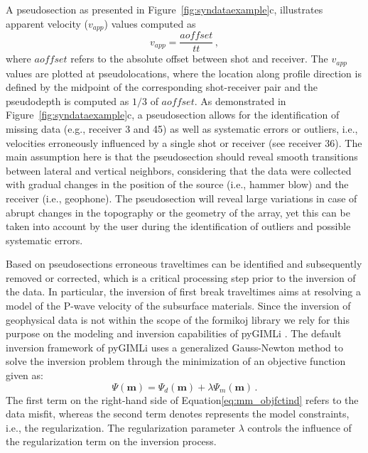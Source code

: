 \documentclass[a4paper,fleqn]{cas-sc}
\newcommand{\vecmat}[1]{\bm #1}
\begin{document}
A pseudosection as presented in Figure~\ref{fig:syndataexample}c, illustrates apparent velocity ($v_{app}$) values computed as
\begin{equation}
	v_{app}=\frac{aoffset}{tt}\,,
	\label{eq:vapp}
\end{equation}
where $aoffset$ refers to the absolute offset between shot and receiver. The $v_{app}$ values are plotted at pseudolocations, where the location along profile direction is defined by the midpoint of the corresponding shot-receiver pair and the pseudodepth is computed as $1/3$ of $aoffset$.
As demonstrated in Figure~\ref{fig:syndataexample}c, a pseudosection allows for the identification of missing data (e.g., receiver 3 and 45) as well as systematic errors or outliers, i.e., velocities erroneously influenced by a single shot or receiver (see receiver 36). The main assumption here is that the pseudosection should reveal smooth transitions between lateral and vertical neighbors, considering that the data were collected with gradual changes in the position of the source (i.e., hammer blow) and the receiver (i.e., geophone). The pseudosection will reveal large variations in case of abrupt changes in the topography or the geometry of the array, yet this can be taken into account by the user during the identification of outliers and possible systematic errors.

Based on pseudosections erroneous traveltimes can be identified and subsequently removed or corrected, which is a critical processing step prior to the inversion of the data. In particular, the inversion of first break traveltimes aims at resolving a model of the P-wave velocity of the subsurface materials. Since the inversion of geophysical data is not within the scope of the formikoj library we rely for this purpose on the modeling and inversion capabilities of pyGIMLi \citep{ruecker2017}. The default inversion framework of pyGIMLi uses a generalized Gauss-Newton method to solve the inversion problem through the minimization of an objective function given as:
\begin{equation}
	\Psi\left(\vecmat{m}\right)=\Psi_d\left(\vecmat{m}\right)+\lambda\Psi_m\left(\vecmat{m}\right)\,.
	\label{eq:mm_objfctind}
\end{equation}
The first term on the right-hand side of Equation\ref{eq:mm_objfctind} refers to the data misfit, whereas the second term denotes represents the model constraints, i.e., the regularization. The regularization parameter $\lambda$ controls the influence of the regularization term on the inversion process.
\end{document}

